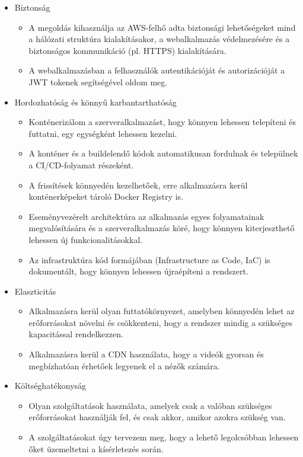\begin{itemize}
  \item Biztonság
  \begin{itemize}
    \item A megoldás kihasználja az AWS-felhő adta biztonsági lehetőségeket mind a hálózati struktúra kialakításakor, a webalkalmazás védelmezésére és a biztonságos kommunikáció (pl. HTTPS) kialakítására.
    \item A webalkalmazásban a felhasználók autentikációját és autorizációját a JWT tokenek segítségével oldom meg.
  \end{itemize}
  \item Hordozhatóság és könnyű karbantarthatóság
   \begin{itemize}
    \item Konténerizálom a szerveralkalmazást, hogy könnyen lehessen telepíteni és futtatni, egy egységként lehessen kezelni.
    \item A konténer és a buildelendő kódok automatikusan fordulnak és települnek a CI/CD-folyamat részeként.
    \item A frissítések könnyedén kezelhetőek, erre alkalmazásra kerül konténerképeket tároló Docker Registry is.
    \item Eseményvezérelt architektúra az alkalmazás egyes folyamatainak megvalósítására és a szerveralkalmazás köré, hogy könnyen kiterjeszthető lehessen új funkcionalitásokkal.
    \item Az infrastruktúra kód formájában (Infrastructure as Code, IaC) is dokumentált, hogy könnyen lehessen újraépíteni a rendszert.
  \end{itemize}
  \item Elaszticitás
  \begin{itemize}
    \item Alkalmazásra kerül olyan futtatókörnyezet, amelyben könnyedén lehet az erőforrásokat növelni és csökkenteni, hogy a rendszer mindig a szükséges kapacitással rendelkezzen.
    \item Alkalmazásra kerül a CDN használata, hogy a videók gyorsan és megbízhatóan érhetőek legyenek el a nézők számára.
  \end{itemize}
  \item Költséghatékonyság
  \begin{itemize}
    \item Olyan szolgáltatások használata, amelyek csak a valóban szükséges erőforrásokat használják fel, és csak akkor, amikor azokra szükség van.
    \item A szolgáltatásokat úgy tervezem meg, hogy a lehető legolcsóbban lehessen őket üzemeltetni a kísérletezés során.
  \end{itemize}
\end{itemize}
